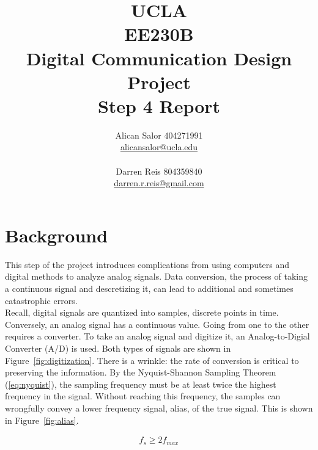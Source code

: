 \documentclass[]{article}
\title{UCLA\\EE230B\\Digital Communication Design Project\\Step 4 Report}
\author{Alican Salor 404271991 \\  \href{mailto:alicansalor@ucla.edu}{alicansalor@ucla.edu} \\ \\
Darren Reis 804359840 \\
\href{mailto:darrer.r.reis@gmail.com}{darren.r.reis@gmail.com} }
\begin{document}
\maketitle

\newpage
\tableofcontents

\newpage
\section{Background}
\label{sec:background}
This step of the project introduces complications from using computers and digital methods to analyze analog signals.  Data conversion, the process of taking a continuous signal and descretizing it, can lead to additional and sometimes catastrophic errors.\\

Recall, digital signals are quantized into samples, discrete points in time.  Conversely, an analog signal has a continuous value.  Going from one to the other requires a converter.  To take an analog signal and digitize it, an Analog-to-Digial Converter (A/D) is used.  Both types of signals are shown in Figure~\ref{fig:digitization}.  There is a wrinkle: the rate of conversion is critical to preserving the information.  By the Nyquist-Shannon Sampling Theorem (\ref{eq:nyquist}), the sampling frequency must be at least twice the highest frequency in the signal.  Without reaching this frequency, the samples can wrongfully convey a lower frequency signal, alias, of the true signal.  This is shown in Figure~\ref{fig:alias}.  

\begin{align}
\label{eq:nyquist}
f_s \geq 2 f_{max}
\end{align}
\end{document}
